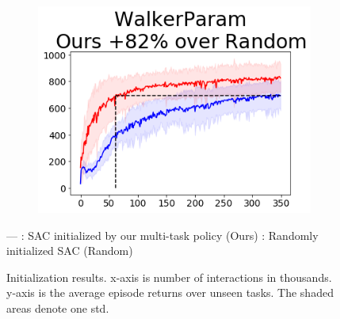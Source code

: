\begin{figure}[t]
{        \begin{subfigure}{0.125\paperwidth}
            \includegraphics[width=\linewidth]{chapter_2/fig/init-sac-vs-train-WalkerParam.png}
        \end{subfigure}}
    \small{\color{red}--- }: SAC initialized by our multi-task policy (Ours) \qquad  {\color{blue}--- }: Randomly initialized SAC (Random)
    \caption{Initialization results.
        x-axis is number of interactions in thousands.
        y-axis is the average episode returns over unseen tasks.
        The shaded areas denote one std. }
    \label{fig:SAC_init}
\end{figure}
